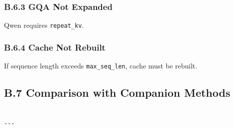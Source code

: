 \subsubsection{B.6.3 GQA Not Expanded}

Qwen requires \texttt{repeat\_kv}.

\subsubsection{B.6.4 Cache Not Rebuilt}

If sequence length exceeds \texttt{max\_seq\_len}, cache must be rebuilt.

\subsection{B.7 Comparison with Companion Methods}

\begin{lstlisting}

---
\end{lstlisting}
